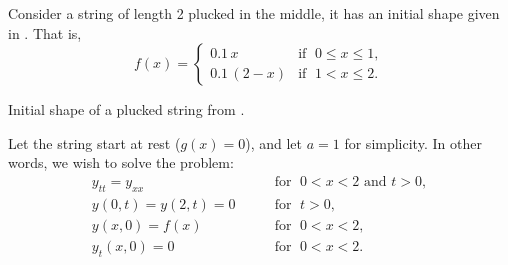 \begin{example} \label{example:pluckedstring}
Consider a string of length 2 plucked in the middle,
it has an initial shape given in .
That is,
\begin{equation*}
f(x) = \begin{cases}
0.1\, x & \text{if } \; 0 \leq x \leq 1 , \\
0.1\, (2-x) & \text{if } \; 1 < x \leq 2 .
\end{cases}
\end{equation*}

\begin{myfig}
\capstart
{}
\caption{Initial shape of a plucked string from
.\label{wave:pluckedstrfig}}
\end{myfig}

Let the string start at rest ($g(x) =
0$), and let $a=1$ for simplicity.  In other words, we wish to
solve the problem:
\begin{equation*}
\begin{array}{ll}
y_{tt} = y_{xx} & \qquad \text{for } \; 0 < x < 2 \text{ and } t > 0, \\
y(0,t) = y(2,t)= 0 & \qquad \text{for } \; t > 0 , \\
y(x,0) = f(x) & \qquad \text{for } \; 0 < x < 2 , \\
y_t(x,0)= 0 & \qquad \text{for } \; 0 < x < 2.
\end{array}
\end{equation*}


\end{example}
